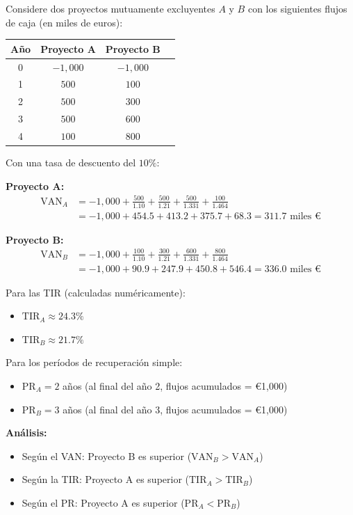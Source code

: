 \begin{ejemplo}
Considere dos proyectos mutuamente excluyentes $A$ y $B$ con los siguientes flujos de caja (en miles de euros):

\begin{center}
\begin{tabular}{cccc}
\toprule
Año & Proyecto A & Proyecto B \\
\midrule
0 & $-1{,}000$ & $-1{,}000$ \\
1 & $500$ & $100$ \\
2 & $500$ & $300$ \\
3 & $500$ & $600$ \\
4 & $100$ & $800$ \\
\bottomrule
\end{tabular}
\end{center}

Con una tasa de descuento del $10\%$:

\textbf{Proyecto A:}
\begin{align*}
\text{VAN}_A &= -1{,}000 + \frac{500}{1.10} + \frac{500}{1.21} + \frac{500}{1.331} + \frac{100}{1.464} \\
&= -1{,}000 + 454.5 + 413.2 + 375.7 + 68.3 = 311.7 \text{ miles €}
\end{align*}

\textbf{Proyecto B:}
\begin{align*}
\text{VAN}_B &= -1{,}000 + \frac{100}{1.10} + \frac{300}{1.21} + \frac{600}{1.331} + \frac{800}{1.464} \\
&= -1{,}000 + 90.9 + 247.9 + 450.8 + 546.4 = 336.0 \text{ miles €}
\end{align*}

Para las TIR (calculadas numéricamente):
\begin{itemize}
\item $\text{TIR}_A \approx 24.3\%$
\item $\text{TIR}_B \approx 21.7\%$
\end{itemize}

Para los períodos de recuperación simple:
\begin{itemize}
\item $\text{PR}_A = 2$ años (al final del año 2, flujos acumulados = €1,000)
\item $\text{PR}_B = 3$ años (al final del año 3, flujos acumulados = €1,000)
\end{itemize}

\textbf{Análisis:}
\begin{itemize}
\item Según el VAN: Proyecto B es superior ($\text{VAN}_B > \text{VAN}_A$)
\item Según la TIR: Proyecto A es superior ($\text{TIR}_A > \text{TIR}_B$)
\item Según el PR: Proyecto A es superior ($\text{PR}_A < \text{PR}_B$)
\end{itemize}


\end{ejemplo}
